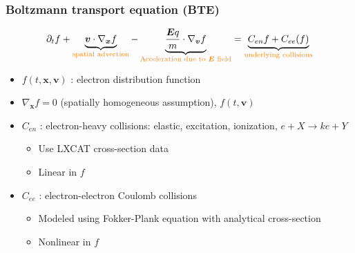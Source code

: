 \documentclass[mathserif, aspectratio=169]{beamer}
\newcommand{\vect}[1]{\boldsymbol{#1}}
\newcommand{\myint}{\int\limits}
\newcommand{\diff}[1]{\, d#1}
\begin{document}
\begin{frame}
	\frametitle{Boltzmann transport equation (BTE)}
	\begin{align}
		\partial_t f  + \underbrace{\vect{v} \cdot \nabla_{\vect{x}} f}_{\textcolor{orange}{\text{spatial advection}}} -\underbrace{\frac{\vect{E} q}{m} \cdot \nabla_{\vect{v }}f}_{\textcolor{orange}{\text{Acceleration due to $\vect{E}$ field}}} = \underbrace{C_{en}f + C_{ee}(f)}_{\textcolor{orange}{\text{underlying collisions}}}
	\end{align}
	\begin{itemize}
		\item $f(t, \vect{x}, \vect{v})$ : electron distribution function
		\item $\nabla_{\vect{x}} f =0$ (spatially homogeneous assumption), $f(t, \vect{v})$
		\item $C_{en}$ : electron-heavy collisions: elastic, excitation, ionization, $e + X \rightarrow k e + Y$
		\begin{itemize}
			\item Use LXCAT cross-section data 
			\item Linear in $f$
		\end{itemize} 
		\item $C_{ee}$ : electron-electron Coulomb collisions 
		\begin{itemize}
			\item Modeled using Fokker-Plank equation with analytical cross-section
			\item Nonlinear in $f$
		\end{itemize}
	\end{itemize}
\end{frame}
\end{document}
